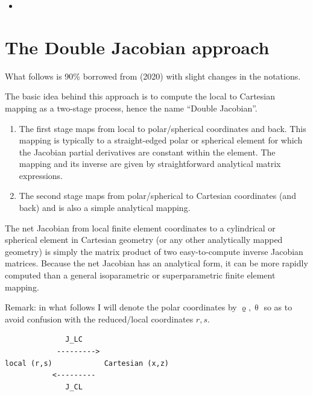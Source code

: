 \vspace{1cm}

\Literature 
\begin{itemize}
\item {}
\end{itemize}

\newpage
\section{The Double Jacobian approach}

What follows is 90\% borrowed from \textcite{moth20} (2020) with slight changes in the notations.

The basic idea behind this approach is to compute the local to Cartesian mapping as a two-stage process, hence the name ``Double Jacobian''. 

\begin{enumerate}
\item 
The first stage maps from local to polar/spherical coordinates and back. This mapping is typically 
to a straight-edged polar or spherical element for which the Jacobian partial derivatives 
are constant within the element. The mapping and its inverse are given by straightforward analytical matrix expressions. 
\item The second stage maps from polar/spherical to Cartesian coordinates (and back) and is also a simple analytical mapping. 
\end{enumerate}
The net Jacobian from local finite element coordinates to a cylindrical or spherical element in Cartesian geometry 
(or any other analytically mapped geometry) is simply the matrix product of two easy-to-compute inverse Jacobian matrices. 
Because the net Jacobian has an analytical form, it can be more rapidly computed than a general 
isoparametric or superparametric finite element mapping.

Remark: in what follows I will denote the polar coordinates by $\upvarrho,\uptheta$ 
so as to avoid confusion with the reduced/local coordinates $r,s$.

\begin{verbatim}
              J_LC
            --------->          
local (r,s)            Cartesian (x,z)
           <---------          
              J_CL
\end{verbatim}



